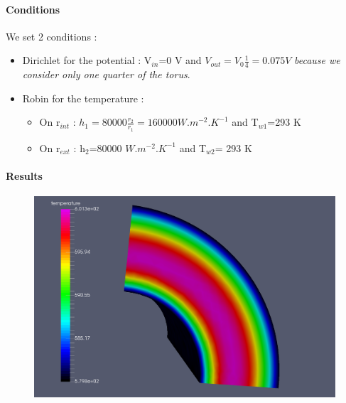 \documentclass[11pt]{amsart}
\begin{document}
\hypertarget{x-conditions}{\paragraph{Conditions}}
We set 2 conditions :


\begin{itemize}

\item Dirichlet for the potential : V${}_{in}$=0 V  and  $V_{out}=V_{0}\frac{1}{4}=0.075  V$ \emph{because we consider only one quarter of the torus}.

\item Robin for the temperature :

\begin{itemize}

\item On r${}_{int}$ : $h_{1}=80000\frac{r_{2}}{r_{1}}=160000 W.m^{-2} .K^{-1}$  and  T${}_{w1}$=293 K

\item On r${}_{ext}$ : h${}_{2}$=80000 $W.m^{-2} .K^{-1}$  and  T${}_{w2}$= 293 K

\end{itemize}

\end{itemize}


\hypertarget{x-results}{\paragraph{Results}}
\begin{figure}
\centering\includegraphics[width=5.0truein]{./images/learning/thermoelectric/Temperature_paraview.png}


\end{figure}
\end{document}

